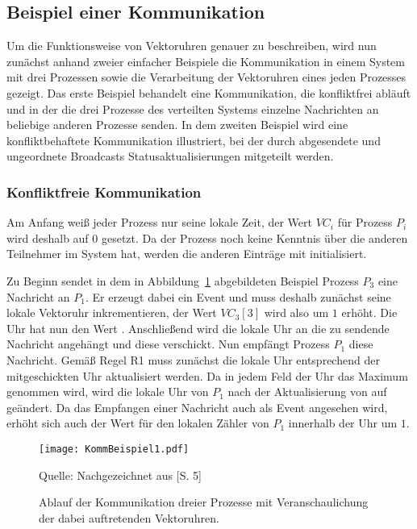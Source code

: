 \subsection{Beispiel einer Kommunikation}

Um die Funktionsweise von Vektoruhren genauer zu beschreiben, wird nun zunächst anhand zweier einfacher Beispiele die Kommunikation in einem System mit drei Prozessen sowie die Verarbeitung der Vektoruhren eines jeden Prozesses gezeigt. Das erste Beispiel behandelt eine Kommunikation, die konfliktfrei abläuft und in der die drei Prozesse des verteilten Systems einzelne Nachrichten an beliebige anderen Prozesse senden. In dem zweiten Beispiel wird eine konfliktbehaftete Kommunikation illustriert, bei der durch abgesendete und ungeordnete Broadcasts Statusaktualisierungen mitgeteilt werden.

\subsubsection{Konfliktfreie Kommunikation}
Am Anfang weiß jeder Prozess nur seine lokale Zeit, der Wert $VC_i$ für Prozess $P_i$ wird deshalb auf $0$ gesetzt. Da der Prozess noch keine Kenntnis über die anderen Teilnehmer im System hat, werden die anderen Einträge mit \qq{$-$} initialisiert.

Zu Beginn sendet in dem in Abbildung~\ref{figure:kommBeispiel1} abgebildeten Beispiel Prozess $P_3$ eine Nachricht an $P_1$. Er erzeugt dabei ein Event und muss deshalb zunächst seine lokale Vektoruhr inkrementieren, der Wert $VC_3[3]$ wird also um $1$ erhöht. Die Uhr hat nun den Wert . Anschließend wird die lokale Uhr an die zu sendende Nachricht angehängt und diese verschickt.
Nun empfängt Prozess $P_1$ diese Nachricht. Gemäß Regel R1 muss zunächst die lokale Uhr entsprechend der mitgeschickten Uhr aktualisiert werden. Da in jedem Feld der Uhr das Maximum genommen wird, wird die lokale Uhr von $P_1$ nach der Aktualisierung von  auf  geändert. Da das Empfangen einer Nachricht auch als Event angesehen wird, erhöht sich auch der Wert für den lokalen Zähler von $P_1$ innerhalb der Uhr um $1$.

\begin{figure}[ht]
	\centering
	\texttt{[image: KommBeispiel1.pdf]}
	\caption[Beispiel einer konfliktfreien Kommunikation]{Ablauf der Kommunikation dreier Prozesse mit Veranschaulichung der dabei auftretenden Vektoruhren.}
	Quelle: Nachgezeichnet aus \cite{Baldoni:2002:FDC:1435723.1437765}[S. 5]
	\label{figure:kommBeispiel1}
\end{figure}
\FloatBarrier

